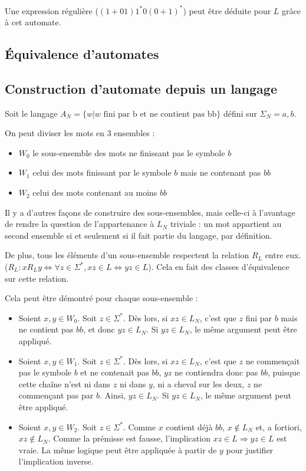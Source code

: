 Une expression régulière ($(1+01)1^*0(0+1)^*$) peut être déduite pour $L$ grâce à cet automate.


\subsection{Équivalence d'automates}




\subsection{Construction d'automate depuis un langage}

Soit le langage $A_N = \{w | w \text{ fini par b et ne contient pas bb}\}$ défini sur $\Sigma_N = {a,b}$.

On peut diviser les mots en 3 ensembles : 

\begin{itemize}
	\item $W_0$ le sous-ensemble des mots ne finissant pas le symbole $b$
	\item $W_1$ celui des mots finissant par le symbole $b$ mais ne contenant pas $bb$
	\item $W_2$ celui des mots contenant au moins $bb$
\end{itemize}

Il y a d'autres façons de construire des sous-ensembles, mais celle-ci à l'avantage de rendre la question de l'appartenance à $L_N$ triviale : un mot appartient au second ensemble si et seulement si il fait partie du langage, par définition.

De plus, tous les éléments d'un sous-ensemble respectent la relation $R_L$ entre eux. ($R_L : xR_Ly \Leftrightarrow \forall z \in \Sigma^*, xz \in L \Leftrightarrow yz \in L$). Cela en fait des classes d'équivalence sur cette relation.

Cela peut être démontré pour chaque sous-ensemble :
\begin{itemize}
	\item Soient $x,y \in W_0$. Soit $z \in \Sigma^*$. Dès lors, si $xz \in L_N$, c'est que $z$ fini par $b$ mais ne contient pas $bb$, et donc $yz \in L_N$. Si $yz \in L_N$, le même argument peut être appliqué.
	\item Soient $x,y \in W_1$. Soit $z \in \Sigma^*$. Dès lors, si $xz \in L_N$, c'est que $z$ ne commençait pas le symbole $b$ et ne contenait pas $bb$, $yz$ ne contiendra donc pas $bb$, puisque cette chaîne n'est ni dans $z$ ni dans $y$, ni a cheval sur les deux, $z$ ne commençant pas par $b$. Ainsi, $yz \in L_N$. Si $yz \in L_N$, le même argument peut être appliqué.
	\item Soient $x,y \in W_2$. Soit $z \in \Sigma^*$. Comme $x$ contient déjà $bb$, $x \notin L_N$ et, a fortiori, $xz \notin L_N$. Comme la prémisse est fausse, l'implication $xz \in L \Rightarrow yz \in L$ est vraie. La même logique peut être appliquée à partir de $y$ pour justifier l'implication inverse.
\end{itemize}

